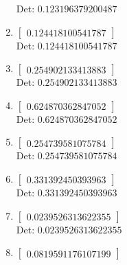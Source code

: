 \documentclass[12pt]{article}
\begin{document}
\begin{enumerate}
Det: $0.123196379200487$\\

\item $\displaystyle \left[\begin{matrix}0.124418100541787\end{matrix}\right]$\\

Det: $0.124418100541787$\\

\item $\displaystyle \left[\begin{matrix}0.254902133413883\end{matrix}\right]$\\

Det: $0.254902133413883$\\

\item $\displaystyle \left[\begin{matrix}0.624870362847052\end{matrix}\right]$\\

Det: $0.624870362847052$\\

\item $\displaystyle \left[\begin{matrix}0.254739581075784\end{matrix}\right]$\\

Det: $0.254739581075784$\\

\item $\displaystyle \left[\begin{matrix}0.331392450393963\end{matrix}\right]$\\

Det: $0.331392450393963$\\

\item $\displaystyle \left[\begin{matrix}0.0239526313622355\end{matrix}\right]$\\

Det: $0.0239526313622355$\\

\item $\displaystyle \left[\begin{matrix}0.0819591176107199\end{matrix}\right]$\\


\end{enumerate}
\end{document}
